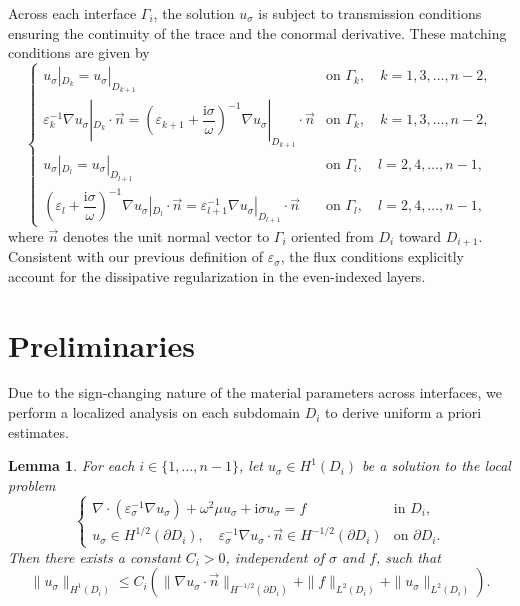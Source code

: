 \documentclass[12pt,reqno]{amsart}
\newtheorem{lemma}[theorem]{Lemma}
\numberwithin{equation}{section}
\begin{document}
Across each interface $\Gamma_i$, the solution $u_\sigma$ is subject to transmission conditions ensuring the continuity of the trace and the conormal derivative. These matching conditions are given by
\begin{equation}\label{eq:trans_cond}
\begin{cases}
u_\sigma|_{D_k} = u_\sigma|_{D_{k+1}}
& \text{on } \Gamma_k,\quad k = 1,3,\ldots,n-2, \\
\varepsilon_k^{-1} \nabla u_\sigma|_{D_k} \cdot\vec{n}
= \left( \varepsilon_{k+1} + \dfrac{\mathrm{i}\sigma}{\omega} \right)^{-1}
\nabla u_\sigma|_{D_{k+1}} \cdot\vec{n}
& \text{on } \Gamma_k,\quad k = 1,3,\ldots,n-2, \\
u_\sigma|_{D_l} = u_\sigma|_{D_{l+1}}
& \text{on } \Gamma_l,\quad l = 2,4,\ldots,n-1, \\
\left( \varepsilon_l + \dfrac{\mathrm{i}\sigma}{\omega} \right)^{-1}
\nabla u_\sigma|_{D_l} \cdot\vec{n}
= \varepsilon_{l+1}^{-1}
\nabla u_\sigma|_{D_{l+1}} \cdot \vec{n}
& \text{on } \Gamma_l,\quad l = 2,4,\ldots,n-1,
\end{cases}
\end{equation}
where $\vec{n}$ denotes the unit normal vector to $\Gamma_i$ oriented from $D_i$ toward $D_{i+1}$. Consistent with our previous definition of $\varepsilon_\sigma$, the flux conditions explicitly account for the dissipative regularization in the even-indexed layers.


\section{Preliminaries}\label{sec3}
Due to  the sign-changing nature of the material parameters across interfaces, we perform a localized analysis on each subdomain $D_i$ to derive uniform a priori estimates.

\begin{lemma}\label{lemm1}
For each $i \in \{1, \dots, n-1\}$, let $u_\sigma \in H^1(D_i)$ be a solution to the local problem
\begin{equation*}
\begin{cases}
\nabla \cdot (\varepsilon^{-1}_\sigma \nabla u_\sigma) + \omega^2 \mu u_\sigma + \mathrm{i}\sigma u_\sigma = f & \text{in } D_i, \\
u_\sigma \in H^{1/2}(\partial D_i), \quad \varepsilon^{-1}_\sigma \nabla u_\sigma \cdot \vec{n} \in H^{-1/2}(\partial D_i) & \text{on } \partial D_i.
\end{cases}
\end{equation*}
Then there exists a constant $C_i > 0$, independent of $\sigma$ and $f$, such that
\begin{equation*}
\|u_\sigma\|_{H^1(D_i)} \le C_i \left( \|\nabla u_\sigma \cdot \vec{n}\|_{H^{-1/2}(\partial D_i)} + \|f\|_{L^2(D_i)} + \|u_\sigma\|_{L^2(D_i)} \right).
\end{equation*}
\end{lemma}
\end{document}
